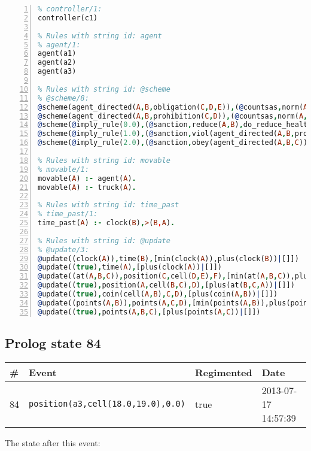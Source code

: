 \documentclass[11pt]{article}\usepackage[utf8]{inputenc}\usepackage{geometry}
\begin{document}
\begin{lstlisting}[language=Prolog, numbers=left]
% Rules with string id: controller
% controller/1:
controller(c1)

% Rules with string id: agent
% agent/1:
agent(a1)
agent(a2)
agent(a3)

% Rules with string id: @scheme
% @scheme/8:
@scheme(agent_directed(A,B,obligation(C,D,E)),(@countsas,norm(A,B,F,obligation(C,D,E)),F),false,(listTrue(C)),(time_past(D)),false,[plus(viol(agent_directed(A,B,obligation(C,D,E))))|[]],[plus(obey(agent_directed(A,B,obligation(C,D,E))))|[]])
@scheme(agent_directed(A,B,prohibition(C,D)),(@countsas,norm(A,B,E,prohibition(C,D)),E),(listTrue(C)),false,(false),false,[plus(viol(agent_directed(A,B,prohibition(C,D))))|[]],[plus(obey(agent_directed(A,B,prohibition(C,D))))|[]])
@scheme(@imply_rule(0.0),(@sanction,reduce(A,B),do_reduce_health(A,B),notifyAgent(A,changed(status))),true,false,false,false,[min(reduce(A,B))|[]],[])
@scheme(@imply_rule(1.0),(@sanction,viol(agent_directed(A,B,prohibition(C,D))),do_sanction(D)),true,false,false,false,[min(viol(agent_directed(A,B,prohibition(C,D))))|[]],[])
@scheme(@imply_rule(2.0),(@sanction,obey(agent_directed(A,B,C))),true,false,false,false,[min(obey(agent_directed(A,B,C)))|[]],[])

% Rules with string id: movable
% movable/1:
movable(A) :- agent(A).
movable(A) :- truck(A).

% Rules with string id: time_past
% time_past/1:
time_past(A) :- clock(B),>(B,A).

% Rules with string id: @update
% @update/3:
@update((clock(A)),time(B),[min(clock(A)),plus(clock(B))|[]])
@update((true),time(A),[plus(clock(A))|[]])
@update((at(A,B,C)),position(C,cell(D,E),F),[min(at(A,B,C)),plus(at(D,E,C))|[]])
@update((true),position(A,cell(B,C),D),[plus(at(B,C,A))|[]])
@update((true),coin(cell(A,B),C,D),[plus(coin(A,B))|[]])
@update((points(A,B)),points(A,C,D),[min(points(A,B)),plus(points(A,D))|[]])
@update((true),points(A,B,C),[plus(points(A,C))|[]])

\end{lstlisting}
\clearpage 
\subsection{Prolog state 84}
\begin{table}[ht]
\centering 
\begin{tabular}{l l l l} 
\textbf{\#} & \textbf{Event} & \textbf{Regimented} & \textbf{Date} \\ [0.5ex] 
\hline
84&\texttt{position(a3,cell(18.0,19.0),0.0)}&true&2013-07-17 14:57:39\\ [1ex] \hline\end{tabular}
\end{table}
The state after this event:
\end{document}
